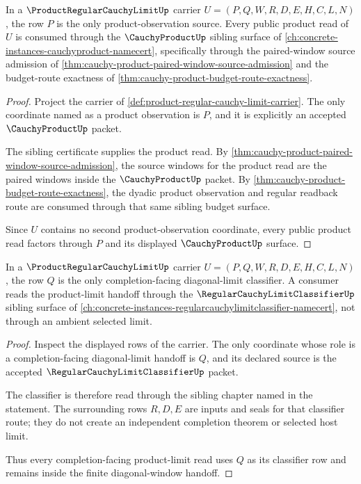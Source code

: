 \begin{theorem}
\label{thm:product-regular-cauchy-limit-product-source-admission}
In a $\ProductRegularCauchyLimitUp$ carrier $U=(P,Q,W,R,D,E,H,C,L,N)$, the row $P$ is the only product-observation source. Every public product read of $U$ is consumed through the $\CauchyProductUp$ sibling surface of \autoref{ch:concrete-instances-cauchyproduct-namecert}, specifically through the paired-window source admission of \autoref{thm:cauchy-product-paired-window-source-admission} and the budget-route exactness of \autoref{thm:cauchy-product-budget-route-exactness}.
\end{theorem}
\begin{proof}
Project the carrier of \autoref{def:product-regular-cauchy-limit-carrier}. The only coordinate named as a product observation is $P$, and it is explicitly an accepted $\CauchyProductUp$ packet.

The sibling certificate supplies the product read. By \autoref{thm:cauchy-product-paired-window-source-admission}, the source windows for the product read are the paired windows inside the $\CauchyProductUp$ packet. By \autoref{thm:cauchy-product-budget-route-exactness}, the dyadic product observation and regular readback route are consumed through that same sibling budget surface.

Since $U$ contains no second product-observation coordinate, every public product read factors through $P$ and its displayed $\CauchyProductUp$ surface.
\end{proof}

\begin{theorem}
\label{thm:product-regular-cauchy-limit-limit-classifier-admission}
In a $\ProductRegularCauchyLimitUp$ carrier $U=(P,Q,W,R,D,E,H,C,L,N)$, the row $Q$ is the only completion-facing diagonal-limit classifier. A consumer reads the product-limit handoff through the $\RegularCauchyLimitClassifierUp$ sibling surface of \autoref{ch:concrete-instances-regularcauchylimitclassifier-namecert}, not through an ambient selected limit.
\end{theorem}
\begin{proof}
Inspect the displayed rows of the carrier. The only coordinate whose role is a completion-facing diagonal-limit handoff is $Q$, and its declared source is the accepted $\RegularCauchyLimitClassifierUp$ packet.

The classifier is therefore read through the sibling chapter named in the statement. The surrounding rows $R,D,E$ are inputs and seals for that classifier route; they do not create an independent completion theorem or selected host limit.

Thus every completion-facing product-limit read uses $Q$ as its classifier row and remains inside the finite diagonal-window handoff.
\end{proof}

